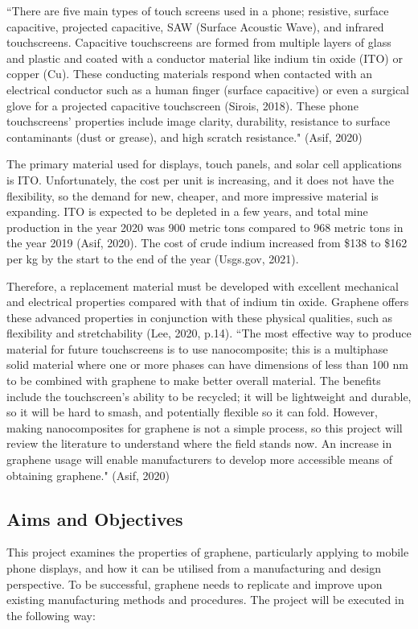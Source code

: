 \documentclass[a4paper,12pt]{article}
\numberwithin{equation}{section}
\numberwithin{figure}{section}
\begin{document}
\noindent ``There are five main types of touch screens used in a phone; resistive, surface capacitive, projected capacitive, SAW (Surface Acoustic Wave), and infrared touchscreens. Capacitive touchscreens are formed from multiple layers of glass and plastic and coated with a conductor material like indium tin oxide (ITO) or copper (Cu). These conducting materials respond when contacted with an electrical conductor such as a human finger (surface capacitive) or even a surgical glove for a projected capacitive touchscreen (Sirois, 2018). These phone touchscreens' properties include image clarity, durability, resistance to surface contaminants (dust or grease), and high scratch resistance." (Asif, 2020)\vspace{\baselineskip}

\noindent The primary material used for displays, touch panels, and solar cell applications is ITO. Unfortunately, the cost per unit is increasing, and it does not have the flexibility, so the demand for new, cheaper, and more impressive material is expanding. ITO is expected to be depleted in a few years, and total mine production in the year 2020 was 900 metric tons compared to 968 metric tons in the year 2019 (Asif, 2020). The cost of crude indium increased from \$138 to \$162 per kg by the start to the end of the year (Usgs.gov, 2021).\vspace{\baselineskip}

\noindent Therefore, a replacement material must be developed with excellent mechanical and electrical properties compared with that of indium tin oxide. Graphene offers these advanced properties in conjunction with these physical qualities, such as flexibility and stretchability (Lee, 2020, p.14). “The most effective way to produce material for future touchscreens is to use nanocomposite; this is a multiphase solid material where one or more phases can have dimensions of less than 100 nm to be combined with graphene to make better overall material. The benefits include the touchscreen’s ability to be recycled; it will be lightweight and durable, so it will be hard to smash, and potentially flexible so it can fold. However, making nanocomposites for graphene is not a simple process, so this project will review the literature to understand where the field stands now. An increase in graphene usage will enable manufacturers to develop more accessible means of obtaining graphene." (Asif, 2020)

\subsection{Aims and Objectives}
\noindent This project examines the properties of graphene, particularly applying to mobile phone displays, and how it can be utilised from a manufacturing and design perspective. To be successful, graphene needs to replicate and improve upon existing manufacturing methods and procedures. The project will be executed in the following way:
\end{document}
